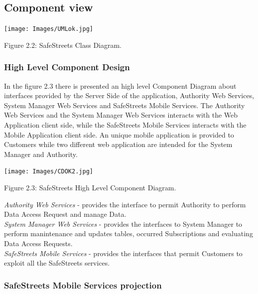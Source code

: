 \documentclass[12pt]{article}
\begin{document}
\subsection{Component view}
\vspace{5mm}
\begin{center}
\texttt{[image: Images/UMLok.jpg]}
\vspace{2mm}

Figure 2.2: SafeStreets Class Diagram.
\end{center}

\newpage
\subsubsection{High Level Component Design}
\vspace{5mm}
In the figure 2.3 there is presented an high level Component Diagram about interfaces provided by the Server Side of the application, Authority Web Services, System Manager Web Services and SafeStreets Mobile Services. The Authority Web Services and the System Manager Web Services interacts with the Web Application client side, while the SafeStreets Mobile Services interacts with the Mobile Application client side. An unique mobile application is provided to Customers while two different web application are intended for the System Manager and Authority.
\begin{center}
\texttt{[image: Images/CDOK2.jpg]}

\vspace{2mm}
Figure 2.3: SafeStreets High Level Component Diagram.
\end{center}

\newpage
\begin{flushleft}
\emph{Authority Web Services} - provides the interface to permit Authority to perform Data Access Request and manage Data.
\vspace{2mm}\\
\emph{System Manager Web Services} - provides the interfaces to System Manager to perform manintenance and updates tables, occurred Subscriptions and evaluating Data Access Requests.
\vspace{2mm}\\
\emph{SafeStreets Mobile Services} - provides the interfaces that permit Customers to exploit all the SafeStreets services.
\end{flushleft}

\subsubsection{SafeStreets Mobile Services projection }
\vspace{5mm}
\end{document}
